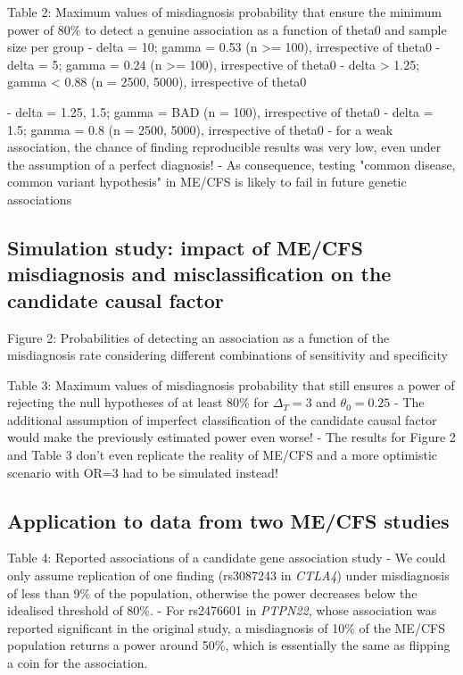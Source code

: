 Table 2: Maximum values of misdiagnosis probability that ensure the minimum power of 80\% to detect a genuine association as a function of theta0 and sample size per group
    - delta = 10; gamma = 0.53 (n >= 100), irrespective of theta0
    - delta = 5; gamma = 0.24 (n >= 100), irrespective of theta0
    - delta > 1.25; gamma < 0.88 (n = 2500, 5000), irrespective of theta0
    
    - delta = 1.25, 1.5; gamma = BAD (n = 100), irrespective of theta0
    - delta = 1.5; gamma = 0.8 (n = 2500, 5000), irrespective of theta0
    - for a weak association, the chance of finding reproducible results was very low, even under the assumption of a perfect diagnosis!
    - As consequence, testing "common disease, common variant hypothesis" in ME/CFS is likely to fail in future genetic associations


\subsection{Simulation study: impact of ME/CFS misdiagnosis and misclassification on the candidate causal factor}

Figure 2: Probabilities of detecting an association as a function of the misdiagnosis rate considering different combinations of sensitivity and specificity

Table 3: Maximum values of misdiagnosis probability that still ensures a power of rejecting the null hypotheses of at least 80\% for $\Delta_T = 3$ and $\theta_0 = 0.25$
    - The additional assumption of imperfect classification of the candidate causal factor would make the previously estimated power even worse!
    - The results for Figure 2 and Table 3 don't even replicate the reality of ME/CFS and a more optimistic scenario with OR=3 had to be simulated instead!


\subsection{Application to data from two ME/CFS studies}

Table 4: Reported associations of a candidate gene association study \citep{steiner2020AutoimmunityRelatedRisk}
    - We could only assume replication of one finding (rs3087243 in \textit{CTLA4}) under misdiagnosis of less than 9\% of the population, otherwise the power decreases below the idealised threshold of 80\%.
    - For rs2476601 in \textit{PTPN22}, whose association was reported significant in the original study, a misdiagnosis of 10\% of the ME/CFS population returns a power around 50\%, which is essentially the same as flipping a coin for the association.

